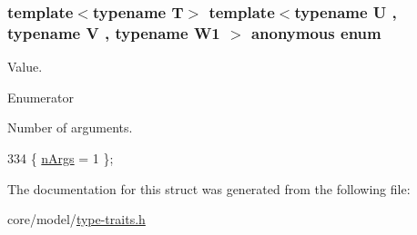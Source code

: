 \subsubsection[{\texorpdfstring{anonymous enum}{anonymous enum}}]{\setlength{\rightskip}{0pt plus 5cm}template$<$typename T$>$ template$<$typename U , typename V , typename W1 $>$ anonymous enum}\hypertarget{structTypeTraits_1_1PtrToMemberTraits_3_01U_07V_1_1_5_08_07W1_08_4_ac385aa5febb4f5a460c0d4558c52ad60}{}\label{structTypeTraits_1_1PtrToMemberTraits_3_01U_07V_1_1_5_08_07W1_08_4_ac385aa5febb4f5a460c0d4558c52ad60}
Value. \begin{Desc}
\item[Enumerator]\par
\begin{description}
\item[{\em 
n\+Args\hypertarget{structTypeTraits_1_1PtrToMemberTraits_3_01U_07V_1_1_5_08_07W1_08_4_ac385aa5febb4f5a460c0d4558c52ad60a93224bd4f506a982c29eb9f110177d6a}{}\label{structTypeTraits_1_1PtrToMemberTraits_3_01U_07V_1_1_5_08_07W1_08_4_ac385aa5febb4f5a460c0d4558c52ad60a93224bd4f506a982c29eb9f110177d6a}
}]Number of arguments. \end{description}
\end{Desc}

\begin{DoxyCode}
334 \{ \hyperlink{structTypeTraits_1_1PtrToMemberTraits_3_01U_07V_1_1_5_08_07W1_08_4_ac385aa5febb4f5a460c0d4558c52ad60a93224bd4f506a982c29eb9f110177d6a}{nArgs} = 1                \};
\end{DoxyCode}


The documentation for this struct was generated from the following file\+:\begin{DoxyCompactItemize}
\item 
core/model/\hyperlink{type-traits_8h}{type-\/traits.\+h}\end{DoxyCompactItemize}
